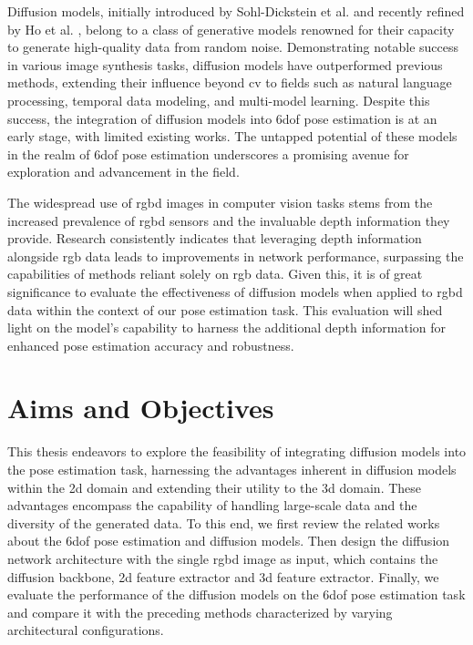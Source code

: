 \documentclass[12pt,DIV14,BCOR12mm,a4paper,footinclude=false,headinclude,parskip=half-,twoside,openright,cleardoublepage=empty,toc=index,bibliography=totoc,listof=totoc]{scrreprt}
\numberwithin{equation}{chapter}
\begin{document}
Diffusion models, initially introduced by Sohl-Dickstein et al. \cite{sohldickstein2015deep} and recently refined by Ho et al. \cite{ho2020denoising}, belong to a class of generative models renowned for their capacity to generate high-quality data from random noise. Demonstrating notable success in various image synthesis tasks, diffusion models have outperformed previous methods, extending their influence beyond \gls{cv} to fields such as natural language processing, temporal data modeling, and multi-model learning. Despite this success, the integration of diffusion models into \gls{6dof} pose estimation is at an early stage, with limited existing works. The untapped potential of these models in the realm of \gls{6dof} pose estimation underscores a promising avenue for exploration and advancement in the field.

The widespread use of \gls{rgbd} images in computer vision tasks stems from the increased prevalence of \gls{rgbd} sensors and the invaluable depth information they provide. Research consistently indicates that leveraging depth information alongside \gls{rgb} data leads to improvements in network performance, surpassing the capabilities of methods reliant solely on \gls{rgb} data. Given this, it is of great significance to evaluate the effectiveness of diffusion models when applied to \gls{rgbd} data within the context of our pose estimation task. This evaluation will shed light on the model's capability to harness the additional depth information for enhanced pose estimation accuracy and robustness.
\section{Aims and Objectives}
This thesis endeavors to explore the feasibility of integrating diffusion models into the pose estimation task, harnessing the advantages inherent in diffusion models within the \gls{2d} domain and extending their utility to the \gls{3d} domain. These advantages encompass the capability of handling large-scale data and the diversity of the generated data. To this end, we first review the related works about the \gls{6dof} pose estimation and diffusion models. Then design the diffusion network architecture with the single \gls{rgbd} image as input, which contains the diffusion backbone, \gls{2d} feature extractor and \gls{3d} feature extractor. Finally, we evaluate the performance of the diffusion models on the \gls{6dof} pose estimation task and compare it with the preceding methods characterized by varying architectural configurations.
\end{document}
